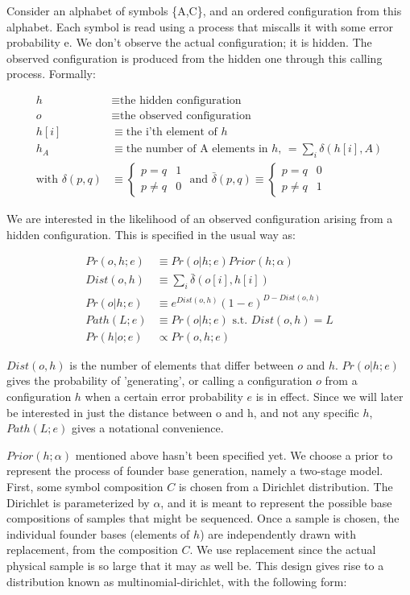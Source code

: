 \documentclass{article}
\begin{document}
Consider an alphabet of symbols \{A,C\}, and an ordered configuration
from this alphabet. Each symbol is read using a process that miscalls
it with some error probability e.  We don't observe the actual
configuration; it is hidden.  The observed configuration is produced
from the hidden one through this calling process.  Formally:

\begin{align*}
h & \equiv \text{the hidden configuration} \\
o & \equiv \text{the observed configuration} \\
h[i] & \equiv \text{the i'th element of } h \\
h_A & \equiv \text{the number of A elements in } h \text{, }
= \sum_i \delta(h[i],A) \\
\text{with }\delta(p,q) & \equiv
\begin{cases}
  p = q & 1 \\
  p \neq q & 0
\end{cases}
\text{ and }
\bar{\delta}(p,q) \equiv
\begin{cases}
  p = q & 0 \\
  p \neq q & 1
\end{cases}
\end{align*}

We are interested in the likelihood of an observed configuration
arising from a hidden configuration.  This is specified in the usual
way as:

\begin{align}
  Pr(o,h;e) & \equiv Pr(o|h;e)Prior(h;\alpha) \\
  Dist(o,h) & \equiv \sum_i \bar{\delta}(o[i],h[i]) \\
  Pr(o|h;e) & \equiv e^{Dist(o,h)}(1-e)^{D-Dist(o,h)} \\
  Path(L;e) & \equiv Pr(o|h;e) \text{ s.t. } Dist(o,h) = L\\
  Pr(h|o;e) & \propto Pr(o,h;e) \nonumber
\end{align}

$Dist(o,h)$ is the number of elements that differ between $o$ and $h$.
$Pr(o|h;e)$ gives the probability of 'generating', or calling a
configuration $o$ from a configuration $h$ when a certain error
probability $e$ is in effect. Since we will later be interested in
just the distance between o and h, and not any specific $h$,
$Path(L;e)$ gives a notational convenience.

$Prior(h;\alpha)$ mentioned above hasn't been specified yet.  We
choose a prior to represent the process of founder base generation,
namely a two-stage model.  First, some symbol composition $C$ is
chosen from a Dirichlet distribution.  The Dirichlet is parameterized
by $\alpha$, and it is meant to represent the possible base
compositions of samples that might be sequenced.  Once a sample is
chosen, the individual founder bases (elements of $h$) are
independently drawn with replacement, from the composition $C$.  We
use replacement since the actual physical sample is so large that it
may as well be. This design gives rise to a distribution known as
multinomial-dirichlet, with the following form:
\end{document}

